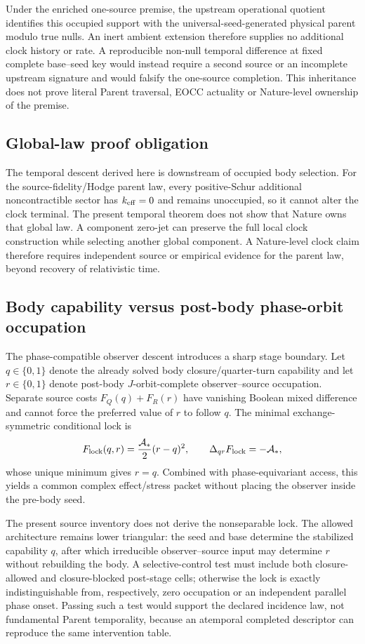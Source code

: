 \documentclass[11pt]{article}
\begin{document}
Under the enriched one-source premise, the upstream operational quotient
identifies this occupied support with the universal-seed-generated physical
parent modulo true nulls. An inert ambient extension therefore supplies no
additional clock history or rate. A reproducible non-null temporal difference
at fixed complete base--seed key would instead require a second source or an
incomplete upstream signature and would falsify the one-source completion.
This inheritance does not prove literal Parent traversal, EOCC actuality or
Nature-level ownership of the premise.

\subsection*{Global-law proof obligation}

The temporal descent derived here is downstream of occupied body selection.
For the source-fidelity/Hodge parent law, every positive-Schur additional
noncontractible sector has \(k_{\rm eff}=0\) and remains unoccupied, so it
cannot alter the clock terminal.  The present temporal theorem does not show
that Nature owns that global law.  A component zero-jet can preserve the full
local clock construction while selecting another global component.  A
Nature-level clock claim therefore requires independent source or empirical
evidence for the parent law, beyond recovery of relativistic time.

\subsection*{Body capability versus post-body phase-orbit occupation}

The phase-compatible observer descent introduces a sharp stage boundary.
Let $q\in\{0,1\}$ denote the already solved body closure/quarter-turn
capability and let $r\in\{0,1\}$ denote post-body $J$-orbit-complete
observer--source occupation.  Separate source costs
$F_Q(q)+F_R(r)$ have vanishing Boolean mixed difference and cannot force the
preferred value of $r$ to follow $q$.  The minimal exchange-symmetric
conditional lock is
\[
 F_{\rm lock}(q,r)=\frac{\mathcal A_*}{2}(r-q)^2,
 \qquad \Delta_{qr}F_{\rm lock}=-\mathcal A_*,
\]
whose unique minimum gives $r=q$.  Combined with phase-equivariant access,
this yields a common complex effect/stress packet without placing the observer
inside the pre-body seed.

The present source inventory does not derive the nonseparable lock.  The
allowed architecture remains lower triangular: the seed and base determine
the stabilized capability $q$, after which irreducible observer--source input
may determine $r$ without rebuilding the body.  A selective-control test must
include both closure-allowed and closure-blocked post-stage cells; otherwise
the lock is exactly indistinguishable from, respectively, zero occupation or
an independent parallel phase onset.  Passing such a test would support the
declared incidence law, not fundamental Parent temporality, because an
atemporal completed descriptor can reproduce the same intervention table.
\end{document}
